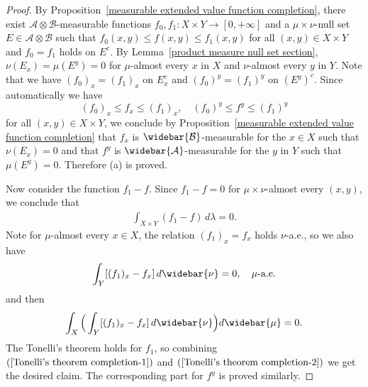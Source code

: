 \begin{proof}
By Proposition~\ref{measurable extended value function completion}, there exist $\mathcal{A}\otimes\mathcal{B}$-measurable functions $f_0,f_1:X\times Y\to[0,+\infty]$ and a $\mu\times\nu$-null set $E\in\mathcal{A}\otimes\mathcal{B}$ such that $f_0(x,y)\leq f(x,y)\leq f_1(x,y)$ for all $(x,y)\in X\times Y$ and $f_0=f_1$ holds on $E^c$. By Lemma~\ref{product measure null set section}, $\nu(E_x)=\mu(E^y)=0$ for $\mu$-almost every $x$ in $X$ and $\nu$-almost every $y$ in $Y$. Note that we have $(f_0)_x=(f_1)_x$ on $E_x^c$ and $(f_0)^y=(f_1)^y$ on $(E^y)^c$. Since automatically we have 
\[(f_0)_x\leq f_x\leq(f_1)_x,\quad(f_0)^y\leq f^y\leq(f_1)^y\]
for all $(x,y)\in X\times Y$, we conclude by Proposition~\ref{measurable extended value function completion} that $f_x$ is $\widebar{\mathcal{B}}$-measurable for the $x\in X$ such that $\nu(E_x)=0$ and that $f^y$ is $\widebar{\mathcal{A}}$-measurable for the $y$ in $Y$ such that $\mu(E^y)=0$. Therefore (a) is proved.\par
Now consider the function $f_1-f$. Since $f_1-f=0$ for $\mu\times\nu$-almost every $(x,y)$, we conclude that
\begin{align}\label{Tonelli's theorem completion-1}
\int_{X\times Y}(f_1-f)\,d\lambda=0.
\end{align}
Note for $\mu$-almost every $x\in X$, the relation $(f_1)_x=f_x$ holds $\nu$-a.e., so we also have
\[\int_Y[(f_1)_x-f_x]\,d\widebar{\nu}=0,\quad\text{$\mu$-a.e}.\]
and then
\begin{align}\label{Tonelli's theorem completion-2}
\int_{X}\Big(\int_Y[(f_1)_x-f_x]\,d\widebar{\nu}\Big)d\widebar{\mu}=0.
\end{align}
The Tonelli's theorem holds for $f_1$, so combining $(\ref{Tonelli's theorem completion-1})$ and $(\ref{Tonelli's theorem completion-2})$ we get the desired claim. The corresponding part for $f^y$ is proved similarly.
\end{proof}

